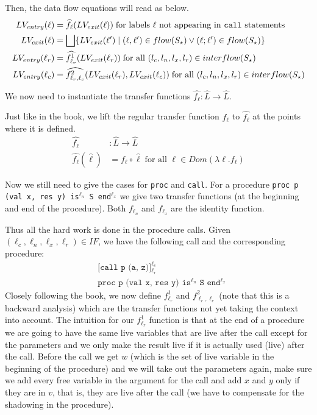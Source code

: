 \documentclass[a4wide,12pt]{article}
\theoremstyle{definition}
\theoremstyle{plain}
\theoremstyle{remark}
\begin{document}
Then, the data flow equations will read as below.
\begin{align*}
LV_{entry}(\ell) & = \widehat{f_\ell}(LV_{exit}(\ell)) \;\text{for labels $\ell$ not appearing in \texttt{call} statements}\\
LV_{exit}(\ell) &= \bigsqcup\{LV_{exit}(\ell') \mid (\ell,\ell') \in flow(S_\star) \lor (\ell;\ell') \in flow(S_\star)\}\\
LV_{entry}(\ell_r) &= \widehat{f^1_{\ell_r}}(LV_{exit}(\ell_r)) \text{\;for all $(l_c,l_n,l_x,l_r) \in interflow(S_\star)$}\\
LV_{entry}(\ell_c) &= \widehat{f^2_{\ell_r,\ell_c}}(LV_{exit}(\ell_r),LV_{exit}(\ell_c)) \text{\;for all $(l_c,l_n,l_x,l_r) \in interflow(S_\star)$}\\
\end{align*}

We now need to instantiate the transfer functions $\widehat{f_\ell} : \hat{L} \to \hat{L}$.

Just like in the book, we lift the regular transfer function $f_\ell$ to $\widehat{f_\ell}$ at the points
where it is defined.
\begin{align*}
\widehat{f_\ell} & : \widehat{L} \to \widehat {L} \\
\widehat{f_\ell} (\widehat{\ell}) & = f_\ell \circ \widehat{\ell} \; \text{for all $\ell \in Dom(\lambda \ell . f_{\ell})$}
\end{align*}

Now we still need to give the cases for \texttt{proc} and \texttt{call}. For
a procedure
\texttt{proc p (val x, res y) is$^{\ell_n}$ S end$^{\ell_x}$}
we give two transfer functions (at the beginning and end of the procedure).
Both $f_{\ell_n}$ and $f_{\ell_x}$ are the identity function.

Thus all the hard work is
done in the procedure calls.
Given $(\ell_c, \ell_n, \ell_x, \ell_r) \in IF$, we have the following call and the corresponding
procedure:
\begin{align*}
& \texttt{[call p (a, z)]$^{\ell_c}_{\ell_r}$} \\
& \texttt{proc p (val x, res y) is$^{\ell_n}$ S end$^{\ell_x}$}
\end{align*}
Closely following the book, we now define $f^1_{\ell_r}$ and $f^2_{\ell_r,\ell_c}$ (note that
this is a backward analysis) which are the transfer functions not yet taking the context into account.  
The intuition for our $f^1_{\ell_r}$ function is that at the end of a procedure we are going
to have the same live variables that are live after the call except for the parameters and we only make the result
live if it is actually used (live) after the call. Before the call we get $w$ (which is the set of live variable 
in the beginning of the procedure) and we will
take out the parameters again, make sure we add every free variable in the
argument for the call and add $x$ and $y$ only if they are in $v$, that is, they are live after the call
(we have to compensate for the shadowing in the procedure).
 
\end{document}
